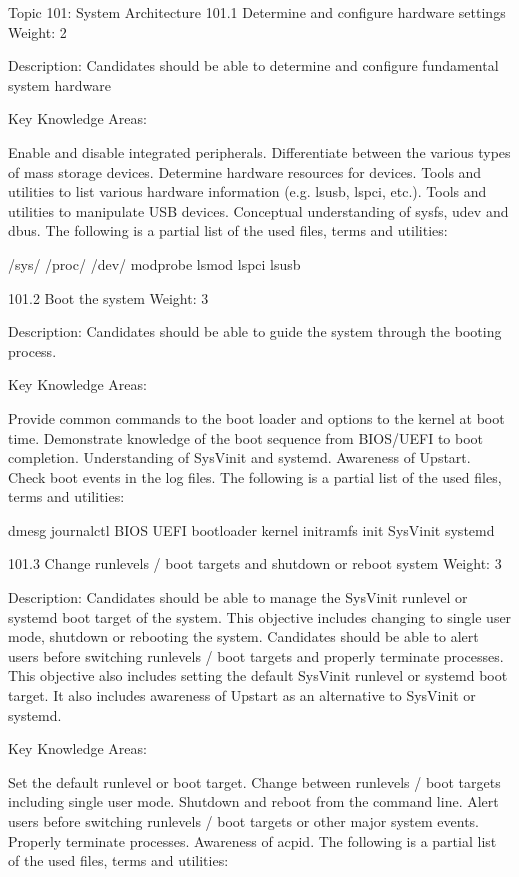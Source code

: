 Topic 101: System Architecture
101.1 Determine and configure hardware settings
Weight: 2

Description: Candidates should be able to determine and configure fundamental system hardware

Key Knowledge Areas:

Enable and disable integrated peripherals.
Differentiate between the various types of mass storage devices.
Determine hardware resources for devices.
Tools and utilities to list various hardware information (e.g. lsusb, lspci, etc.).
Tools and utilities to manipulate USB devices.
Conceptual understanding of sysfs, udev and dbus.
The following is a partial list of the used files, terms and utilities:

/sys/
/proc/
/dev/
modprobe
lsmod
lspci
lsusb
 

101.2 Boot the system
Weight: 3

Description: Candidates should be able to guide the system through the booting process.

Key Knowledge Areas:

Provide common commands to the boot loader and options to the kernel at boot time.
Demonstrate knowledge of the boot sequence from BIOS/UEFI to boot completion.
Understanding of SysVinit and systemd.
Awareness of Upstart.
Check boot events in the log files.
The following is a partial list of the used files, terms and utilities:

dmesg
journalctl
BIOS
UEFI
bootloader
kernel
initramfs
init
SysVinit
systemd
 

101.3 Change runlevels / boot targets and shutdown or reboot system
Weight: 3

Description: Candidates should be able to manage the SysVinit runlevel or systemd boot target of the system. This objective includes changing to single user mode, shutdown or rebooting the system. Candidates should be able to alert users before switching runlevels / boot targets and properly terminate processes. This objective also includes setting the default SysVinit runlevel or systemd boot target. It also includes awareness of Upstart as an alternative to SysVinit or systemd.

Key Knowledge Areas:

Set the default runlevel or boot target.
Change between runlevels / boot targets including single user mode.
Shutdown and reboot from the command line.
Alert users before switching runlevels / boot targets or other major system events.
Properly terminate processes.
Awareness of acpid.
The following is a partial list of the used files, terms and utilities:

